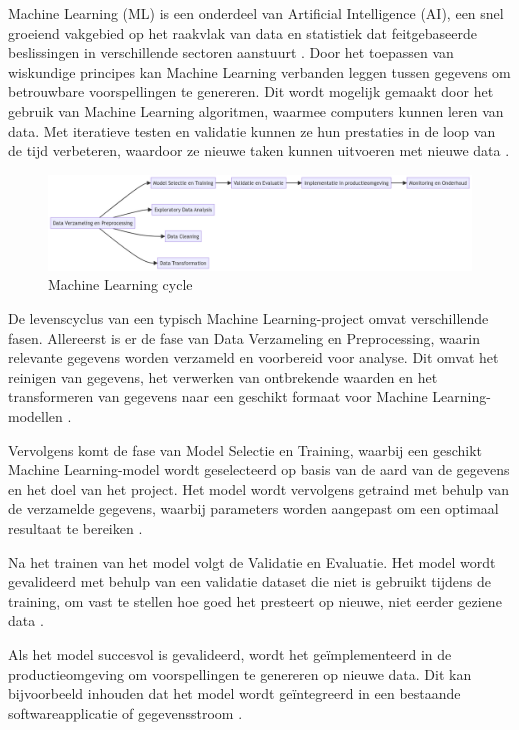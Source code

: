 Machine Learning (ML) is een onderdeel van Artificial Intelligence (AI), een snel groeiend vakgebied op het raakvlak van data en statistiek dat feitgebaseerde beslissingen in verschillende sectoren aanstuurt \autocite{Jordan2015}. Door het toepassen van wiskundige principes kan Machine Learning verbanden leggen tussen gegevens om betrouwbare voorspellingen te genereren. Dit wordt mogelijk gemaakt door het gebruik van Machine Learning algoritmen, waarmee computers kunnen leren van data. Met iteratieve testen en validatie kunnen ze hun prestaties in de loop van de tijd verbeteren, waardoor ze nieuwe taken kunnen uitvoeren met nieuwe data \autocite{Shaveta2023}.\newline

\begin{figure}[h]
    \includegraphics[width=\linewidth]{mlcycle.png}
    \caption{Machine Learning cycle}
    \label{fig:ML_cycle}
\end{figure}

De levenscyclus van een typisch Machine Learning-project omvat verschillende fasen. Allereerst is er de fase van Data Verzameling en Preprocessing, waarin relevante gegevens worden verzameld en voorbereid voor analyse. Dit omvat het reinigen van gegevens, het verwerken van ontbrekende waarden en het transformeren van gegevens naar een geschikt formaat voor Machine Learning-modellen \autocite{Schlegel2022}.

Vervolgens komt de fase van Model Selectie en Training, waarbij een geschikt Machine Learning-model wordt geselecteerd op basis van de aard van de gegevens en het doel van het project. Het model wordt vervolgens getraind met behulp van de verzamelde gegevens, waarbij parameters worden aangepast om een optimaal resultaat te bereiken \autocite{Schlegel2022}.

Na het trainen van het model volgt de Validatie en Evaluatie. Het model wordt gevalideerd met behulp van een validatie dataset die niet is gebruikt tijdens de training, om vast te stellen hoe goed het presteert op nieuwe, niet eerder geziene data \autocite{Schlegel2022}.

Als het model succesvol is gevalideerd, wordt het geïmplementeerd in de productieomgeving om voorspellingen te genereren op nieuwe data. Dit kan bijvoorbeeld inhouden dat het model wordt geïntegreerd in een bestaande softwareapplicatie of gegevensstroom \autocite{Schlegel2022}.


